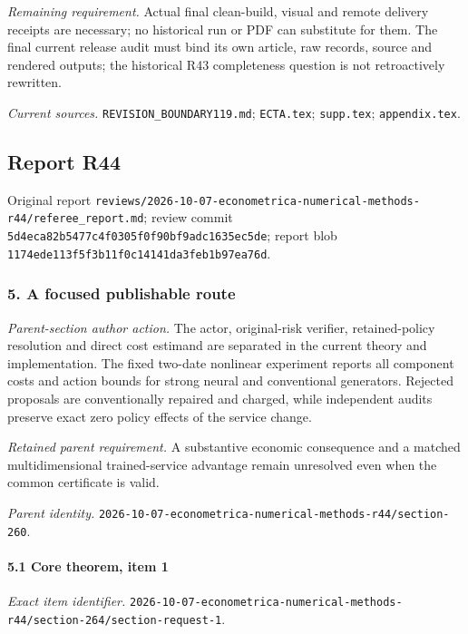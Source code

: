 \par\emph{Remaining requirement.} Actual final clean-build, visual and remote delivery receipts are necessary; no historical run or PDF can substitute for them. The final current release audit must bind its own article, raw records, source and rendered outputs; the historical R43 completeness question is not retroactively rewritten.

\par\emph{Current sources.} \nolinkurl{REVISION_BOUNDARY119.md}; \nolinkurl{ECTA.tex}; \nolinkurl{supp.tex}; \nolinkurl{appendix.tex}.

\subsection{Report R44}

Original report \nolinkurl{reviews/2026-10-07-econometrica-numerical-methods-r44/referee_report.md}; review commit \nolinkurl{5d4eca82b5477c4f0305f0f90bf9adc1635ec5de}; report blob \nolinkurl{1174ede113f5f3b11f0c14141da3feb1b97ea76d}.

\subsubsection{5. A focused publishable route}

\emph{Parent-section author action.} The actor, original-risk verifier, retained-policy resolution and direct cost estimand are separated in the current theory and implementation. The fixed two-date nonlinear experiment reports all component costs and action bounds for strong neural and conventional generators. Rejected proposals are conventionally repaired and charged, while independent audits preserve exact zero policy effects of the service change.

\par\emph{Retained parent requirement.} A substantive economic consequence and a matched multidimensional trained-service advantage remain unresolved even when the common certificate is valid.

\par\emph{Parent identity.} \nolinkurl{2026-10-07-econometrica-numerical-methods-r44/section-260}.

\paragraph{5.1 Core theorem, item 1}

\emph{Exact item identifier.} \nolinkurl{2026-10-07-econometrica-numerical-methods-r44/section-264/section-request-1}.

